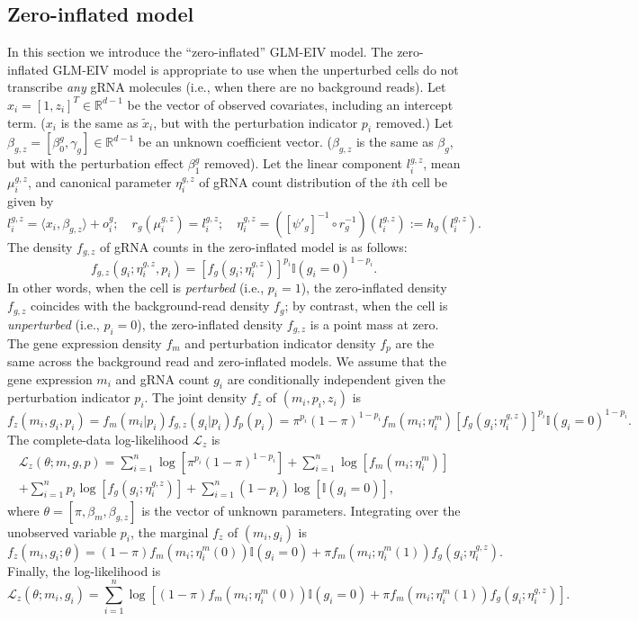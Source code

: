 \documentclass[12pt]{article}
\begin{document}
\begin{appendices}
\begin{refsection}
		\section{Zero-inflated model}\label{sec:zero_inf_model}
		In this section we introduce the ``zero-inflated'' GLM-EIV model. The zero-inflated GLM-EIV model is appropriate to use when the unperturbed cells do not transcribe \textit{any} gRNA molecules (i.e., when there are no background reads). Let $x_i = [1, z_i]^T \in \mathbb{R}^{d-1}$ be the vector of observed covariates, including an intercept term. ($x_i$ is the same as $\tilde{x}_i$, but with the perturbation indicator $p_i$ removed.) Let $\beta_{g,z} = [\beta^g_0, \gamma_g] \in \mathbb{R}^{d-1}$ be an unknown coefficient vector. ($\beta_{g,z}$ is the same as $\beta_g$, but with the perturbation effect $\beta^g_1$ removed). Let the linear component $l^{g,z}_i$, mean $\mu^{g,z}_i$, and canonical parameter $\eta^{g,z}_i$ of gRNA count distribution of the $i$th cell be given by
		$$
		l^{g,z}_i = \langle x_i, \beta_{g,z} \rangle + o^g_i; \quad
		r_g(\mu^{g,z}_i) = l^{g,z}_i; \quad
		\eta^{g,z}_i = ([\psi'_g]^{-1} \circ r^{-1}_g)(l^{g,z}_i) := h_g(l^{g,z}_i).
		$$
		The density $f_{g,z}$ of gRNA counts in the zero-inflated model is as follows:
		$$f_{g,z}(g_i; \eta^{g,z}_i, p_i) = [f_g(g_i;\eta^{g,z}_i)]^{p_i} \mathbb{I}(g_i = 0)^{1-p_i}.$$
		In other words, when the cell is \textit{perturbed} (i.e., $p_i = 1$), the zero-inflated density $f_{g,z}$ coincides with the background-read density $f_g$; by contrast, when the cell is \textit{unperturbed} (i.e., $p_i = 0$), the zero-inflated density $f_{g,z}$ is a point mass at zero. The gene expression density $f_m$ and perturbation indicator density $f_p$ are the same across the background read and zero-inflated models. We assume that the gene expression $m_i$ and gRNA count $g_i$ are conditionally independent given the perturbation indicator $p_i$. The joint density $f_z$ of $(m_i, p_i, z_i)$ is
		\begin{equation*}
		f_z(m_i, g_i, p_i) = f_m(m_i | p_i) f_{g,z}(g_i | p_i) f_p(p_i) = \pi^{p_i} (1-\pi)^{1-p_i} f_m(m_i; \eta^m_i)[f_g(g_i; \eta_i^{g,z})]^{p_i} \mathbb{I}(g_i = 0)^{1-p_i}.
		\end{equation*}
		The complete-data log-likelihood $\mathcal{L}_z$ is
		\begin{multline*}
		\mathcal{L}_z(\theta; m, g, p) = \sum_{i=1}^n \log \left[ \pi^{p_i} (1-\pi)^{1-p_i} \right] + \sum_{i=1}^n \log\left[f_m(m_i; \eta^m_i) \right] \\ + \sum_{i=1}^n p_i \log \left[f_{g}(g_i; \eta_i^{g,z}) \right] + \sum_{i=1}^n (1 - p_i)\log\left[ \mathbb{I}(g_i = 0) \right],
		\end{multline*}
		where $\theta = [\pi, \beta_m, \beta_{g,z}]$ is the vector of unknown parameters.
		Integrating over the unobserved variable $p_i$, the marginal $f_z$ of $(m_i, g_i)$ is
		$$f_z(m_i, g_i; \theta) = (1-\pi) f_m(m_i;\eta^m_i(0)) \mathbb{I}(g_i = 0) + \pi f_m(m_i; \eta^m_i(1)) f_g(g_i;\eta^{g,z}_i).$$ Finally, the log-likelihood is
		$$
		\mathcal{L}_z(\theta; m_i, g_i) = \sum_{i=1}^n \log\left[ (1-\pi) f_m(m_i;\eta^m_i(0)) \mathbb{I}(g_i = 0) + \pi f_m(m_i; \eta^m_i(1)) f_g(g_i;\eta^{g,z}_i) \right].
		$$
		

\end{refsection}
\end{appendices}
\end{document}
